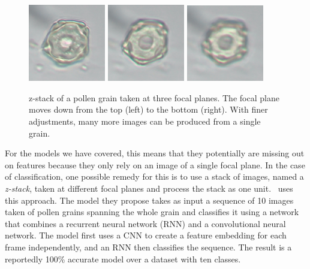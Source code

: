 \begin{figure}[htbp]
  \centering
  \includegraphics[width=0.3\textwidth]{figs/related/zstack/Snap-049.png}
  \hfill%
  \includegraphics[width=0.3\textwidth]{figs/related/zstack/Snap-050.png}
  \hfill%
  \includegraphics[width=0.3\textwidth]{figs/related/zstack/Snap-051.png}
  \caption[z-stack of pollen taken at three focal planes]{z-stack of a pollen grain taken at three focal planes. The focal plane moves down from the top (left) to the bottom (right). With finer adjustments, many more images can be produced from a single grain.}\label{fig:related-zstack}
\end{figure}

For the models we have covered, this means that they potentially are missing out on features because they only rely on an image of a single focal plane.
In the case of classification, one possible remedy for this is to use a stack of images, named a \textit{z-stack}, taken at different focal planes and process the stack as one unit.\ \textcite{DaoodAndRibeiro_2018} uses this approach.
The model they propose takes as input a sequence of 10 images taken of pollen grains spanning the whole grain and classifies it using a network that combines a recurrent neural network (RNN) and a convolutional neural network.
The model first uses a CNN to create a feature embedding for each frame independently, and an RNN then classifies the sequence.
The result is a reportedly 100\% accurate model over a dataset with ten classes.

